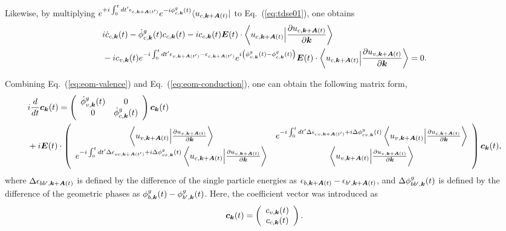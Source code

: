 Likewise, by multiplying $e^{+i\int^t_0dt' \epsilon_{c,\boldsymbol k+ \boldsymbol A(t')}} e^{-i\phi^g_{c,\boldsymbol k}(t)} \langle u_{c,\boldsymbol k+\boldsymbol A(t)}|$ to Eq.~(\ref{eq:tdse01}), one obtains
\begin{align}
&i \dot c_{c,\boldsymbol k}(t) - \dot \phi^g_{c,\boldsymbol k}(t) c_{c,\boldsymbol k}(t) - i c_{c,\boldsymbol k}(t) \boldsymbol E(t)\cdot \left \langle u_{c,\boldsymbol k+\boldsymbol A(t)}\Big |\frac{\partial u_{c,\boldsymbol k+\boldsymbol A(t)}}{\partial \boldsymbol k} \right \rangle \nonumber \\
&- i c_{v,\boldsymbol k}(t) e^{-i\int^t_0dt' \epsilon_{v,\boldsymbol k+ \boldsymbol A(t')}-\epsilon_{c,\boldsymbol k+ \boldsymbol A(t')}} e^{i\left (\phi^g_{v,\boldsymbol k}(t)-\phi^g_{c,\boldsymbol k}(t)\right )} 
\boldsymbol E(t)\cdot \left \langle u_{c,\boldsymbol k+\boldsymbol A(t)}\Big |\frac{\partial u_{v,\boldsymbol k+\boldsymbol A(t)}}{\partial \boldsymbol k} \right \rangle = 0.
\label{eq:eom-conduction}
\end{align}

Combining Eq.~(\ref{eq:eom-valence}) and Eq.~(\ref{eq:eom-conduction}), one can obtain the following matrix form,
\begin{align}
&i\frac{d}{dt} \boldsymbol c_{\boldsymbol k}(t) = 
\left(
    \begin{array}{cc}
      \dot \phi^g_{v,\boldsymbol k}(t) & 
      0 \\
      0 &
      \dot \phi^g_{c,\boldsymbol k}(t)
    \end{array}
    \right) \boldsymbol c_{\boldsymbol k}(t) \nonumber \\
& +i\boldsymbol E(t)\cdot \left(
    \begin{array}{cc}
      \left \langle u_{v,\boldsymbol k+\boldsymbol A(t)}\Big |\frac{\partial u_{v,\boldsymbol k+\boldsymbol A(t)}}{\partial \boldsymbol k} \right \rangle & 
      e^{-i\int^t_0dt' \Delta \epsilon_{cv,\boldsymbol k+ \boldsymbol A(t')}+i \Delta \phi^g_{cv,\boldsymbol k}(t)} 
  \left \langle u_{v,\boldsymbol k+\boldsymbol A(t)}\Big |\frac{\partial u_{c,\boldsymbol k+\boldsymbol A(t)}}{\partial \boldsymbol k} \right \rangle \\
      e^{-i\int^t_0dt' \Delta \epsilon_{vc,\boldsymbol k+ \boldsymbol A(t')}+i \Delta \phi^g_{vc,\boldsymbol k}(t)} 
  \left \langle u_{c,\boldsymbol k+\boldsymbol A(t)}\Big |\frac{\partial u_{v,\boldsymbol k+\boldsymbol A(t)}}{\partial \boldsymbol k} \right \rangle &
      \left \langle u_{v,\boldsymbol k+\boldsymbol A(t)}\Big |\frac{\partial u_{v,\boldsymbol k+\boldsymbol A(t)}}{\partial \boldsymbol k} \right \rangle
    \end{array}
    \right) \boldsymbol c_{\boldsymbol k}(t),
\end{align}
where $\Delta\epsilon_{bb',\boldsymbol k+ \boldsymbol A(t)}$ is defined by the difference of the single particle energies as $\epsilon_{b,\boldsymbol k+ \boldsymbol A(t)}-\epsilon_{b',\boldsymbol k+ \boldsymbol A(t)}$, and $\Delta \phi^g_{bb',\boldsymbol k}(t)$ is defined by the difference of the geometric phases as $\phi^g_{b,\boldsymbol k}(t)-\phi^g_{b',\boldsymbol k}(t)$. Here, the coefficient vector was introduced as
\begin{align}
\boldsymbol c_{\boldsymbol k}(t) = \left(
    \begin{array}{cc}
      c_{v,\boldsymbol k}(t) \\
      c_{c,\boldsymbol k}(t)
    \end{array}
    \right).
\end{align}

